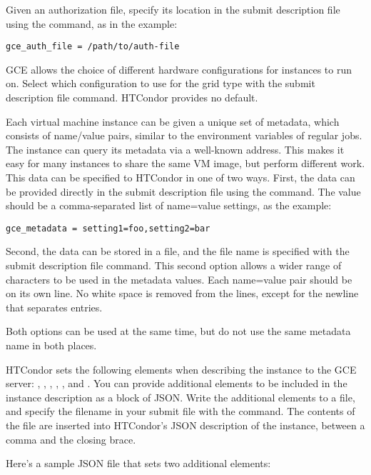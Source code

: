 Given an authorization file, specify its location in
the submit description file using the  command,
as in the example:
\begin{verbatim}
gce_auth_file = /path/to/auth-file
\end{verbatim}

GCE allows the choice of different hardware configurations 
for instances to run on.
Select which configuration to use for the  grid type
with the  submit description file command.
HTCondor provides no default.

Each virtual machine instance can be given a unique set of metadata,
which consists of name/value pairs, similar to the environment variables
of regular jobs.
The instance can query its metadata via a well-known address.
This makes it easy for many instances to share the same VM image,
but perform different work.
This data can be specified to HTCondor in one of two ways.
First, the data can be provided directly in the submit description file 
using the  command.
The value should be a comma-separated list of name=value settings, 
as the example:
\begin{verbatim}
gce_metadata = setting1=foo,setting2=bar
\end{verbatim}

Second, the data can be stored in a file, 
and the file name is specified with the
 submit description file command.
This second option allows a wider range of characters to be used in the
metadata values.
Each name=value pair should be on its own line.
No white space is removed from the lines, except for the newline that
separates entries.

Both options can be used at the same time, 
but do not use the same metadata name in both places.

HTCondor sets the following elements when describing the instance
to the GCE server: , ,
, , ,
and .
You can provide additional elements to be included in the instance
description as a block of JSON.
Write the additional elements to a file, and specify the filename
in your submit file with the  command.
The contents of the file are inserted into HTCondor's JSON description
of the instance, between a comma and the closing brace.

Here's a sample JSON file that sets two additional elements:

